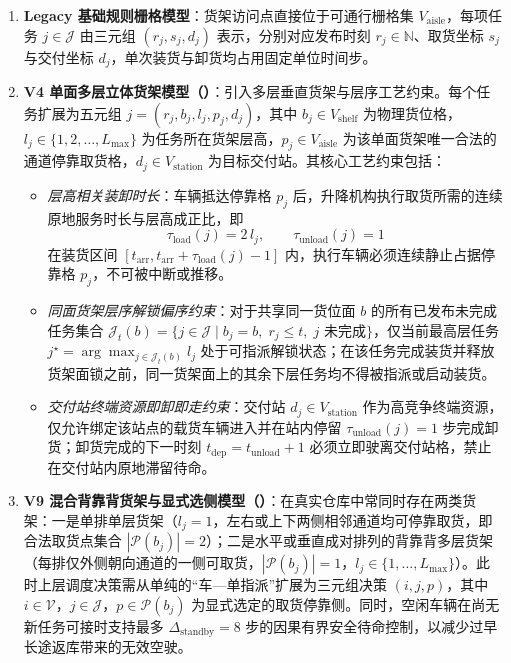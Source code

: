 \begin{enumerate}
  \item \textbf{Legacy 基础规则栅格模型}：货架访问点直接位于可通行栅格集 $V_{\text{aisle}}$，每项任务 $j \in \mathcal{J}$ 由三元组 $(r_j, s_j, d_j)$ 表示，分别对应发布时刻 $r_j \in \mathbb{N}$、取货坐标 $s_j$ 与交付坐标 $d_j$，单次装货与卸货均占用固定单位时间步。
  \item \textbf{V4 单面多层立体货架模型（）}：引入多层垂直货架与层序工艺约束。每个任务扩展为五元组 $j = (r_j, b_j, l_j, p_j, d_j)$，其中 $b_j \in V_{\text{shelf}}$ 为物理货位格，$l_j \in \{1, 2, \dots, L_{\max}\}$ 为任务所在货架层高，$p_j \in V_{\text{aisle}}$ 为该单面货架唯一合法的通道停靠取货格，$d_j \in V_{\text{station}}$ 为目标交付站。其核心工艺约束包括：
  \begin{itemize}
    \item \emph{层高相关装卸时长}：车辆抵达停靠格 $p_j$ 后，升降机构执行取货所需的连续原地服务时长与层高成正比，即
    \begin{equation}
      \tau_{\text{load}}(j) = 2\,l_j, \qquad \tau_{\text{unload}}(j) = 1
      \label{eq:v4-service-time}
    \end{equation}
    在装货区间 $[t_{\text{arr}}, t_{\text{arr}} + \tau_{\text{load}}(j) - 1]$ 内，执行车辆必须连续静止占据停靠格 $p_j$，不可被中断或推移。
    \item \emph{同面货架层序解锁偏序约束}：对于共享同一货位面 $b$ 的所有已发布未完成任务集合 $\mathcal{J}_t(b) = \{j \in \mathcal{J} \mid b_j = b,\; r_j \le t,\; j \text{ 未完成}\}$，仅当前最高层任务 $j^\star = \arg\max_{j \in \mathcal{J}_t(b)} l_j$ 处于可指派解锁状态；在该任务完成装货并释放货架面锁之前，同一货架面上的其余下层任务均不得被指派或启动装货。
    \item \emph{交付站终端资源即卸即走约束}：交付站 $d_j \in V_{\text{station}}$ 作为高竞争终端资源，仅允许绑定该站点的载货车辆进入并在站内停留 $\tau_{\text{unload}}(j)=1$ 步完成卸货；卸货完成的下一时刻 $t_{\text{dep}} = t_{\text{unload}} + 1$ 必须立即驶离交付站格，禁止在交付站内原地滞留待命。
  \end{itemize}
  \item \textbf{V9 混合背靠背货架与显式选侧模型（）}：在真实仓库中常同时存在两类货架：一是单排单层货架（$l_j = 1$，左右或上下两侧相邻通道均可停靠取货，即合法取货点集合 $|\mathcal{P}(b_j)| = 2$）；二是水平或垂直成对排列的背靠背多层货架（每排仅外侧朝向通道的一侧可取货，$|\mathcal{P}(b_j)| = 1$，$l_j \in \{1,\dots,L_{\max}\}$）。此时上层调度决策需从单纯的“车—单指派”扩展为三元组决策 $(i, j, p)$，其中 $i \in \mathcal{V}$，$j \in \mathcal{J}$，$p \in \mathcal{P}(b_j)$ 为显式选定的取货停靠侧。同时，空闲车辆在尚无新任务可接时支持最多 $\Delta_{\text{standby}} = 8$ 步的因果有界安全待命控制，以减少过早长途返库带来的无效空驶。
\end{enumerate}

